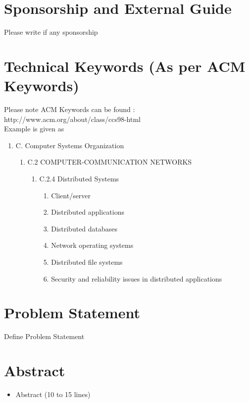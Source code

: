 \documentclass[oneside,a4paper,12pt]{report}
\begin{document}
\section{ Sponsorship and External Guide} 
Please write if any sponsorship


\section{Technical Keywords (As per ACM Keywords)}
Please note ACM Keywords can be found : http://www.acm.org/about/class/ccs98-html \\
Example is given as
\begin{enumerate}
	\item C. Computer Systems Organization 
	\begin{enumerate}
		\item C.2 COMPUTER-COMMUNICATION NETWORKS 
		\begin{enumerate}
			\item C.2.4 Distributed Systems 
			\begin{enumerate}
				\item  Client/server 
\item Distributed applications
\item Distributed databases
\item Network operating systems 
\item Distributed file systems
\item Security and reliability issues in distributed applications
	 		\end{enumerate} 
		\end{enumerate} 
	  

	
	\end{enumerate}
\end{enumerate}



\section{Problem Statement}
\label{sec:problem}
        Define Problem Statement
\section{Abstract}
\begin{itemize}
	\item Abstract (10 to 15 lines)
\end{itemize}
\end{document}
